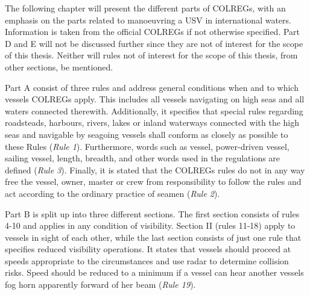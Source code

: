 The following chapter will present the different parts of COLREGs, with an emphasis on the parts related to manoeuvring a USV in international waters. Information is taken from the official COLREGs \cite{colreg} if not otherwise specified. Part D and E will not be discussed further since they are not of interest for the scope of this thesis. Neither will rules not of interest for the scope of this thesis, from other sections, be mentioned.

Part A consist of three rules and address general conditions when and to which vessels COLREGs apply. This includes all vessels navigating on high seas and all waters connected therewith. Additionally, it specifies that special rules regarding roadsteads, harbours, rivers, lakes or inland waterways connected with the high seas and navigable by seagoing vessels shall conform as closely as possible to these Rules (\textit{Rule 1}). Furthermore, words such as vessel, power-driven vessel, sailing vessel, length, breadth, and other words used in the regulations are defined (\textit{Rule 3}). Finally, it is stated that the COLREGs rules do not in any way free the vessel, owner, master or crew from responsibility to follow the rules and act according to the ordinary practice of seamen (\textit{Rule 2}).

Part B is split up into three different sections. The first section consists of rules 4-10 and applies in any condition of visibility. Section II (rules 11-18) apply to vessels in sight of each other, while the last section consists of just one rule that specifies reduced visibility operations. It states that vessels should proceed at speeds appropriate to the circumstances and use radar to determine collision risks. Speed should be reduced to a minimum if a vessel can hear another vessels fog horn apparently forward of her beam (\textit{Rule 19}).

